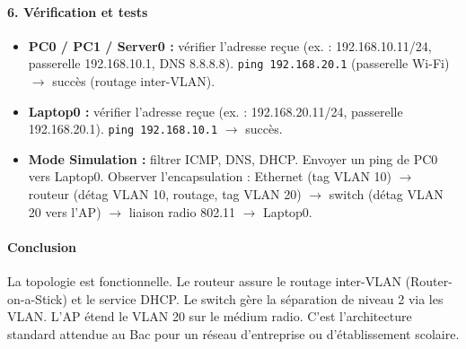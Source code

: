 \documentclass[11pt]{article}
\begin{document}
\begin{exoresolu}
\paragraph{6. Vérification et tests}
\begin{itemize}
    \item \textbf{PC0 / PC1 / Server0 :} vérifier l'adresse reçue (ex. : 192.168.10.11/24, passerelle 192.168.10.1, DNS 8.8.8.8). \texttt{ping 192.168.20.1} (passerelle Wi-Fi) $\rightarrow$ succès (routage inter-VLAN).
    \item \textbf{Laptop0 :} vérifier l'adresse reçue (ex. : 192.168.20.11/24, passerelle 192.168.20.1). \texttt{ping 192.168.10.1} $\rightarrow$ succès.
    \item \textbf{Mode Simulation :} filtrer ICMP, DNS, DHCP. Envoyer un ping de PC0 vers Laptop0. Observer l'encapsulation : Ethernet (tag VLAN 10) $\rightarrow$ routeur (détag VLAN 10, routage, tag VLAN 20) $\rightarrow$ switch (détag VLAN 20 vers l'AP) $\rightarrow$ liaison radio 802.11 $\rightarrow$ Laptop0.
\end{itemize}

\paragraph{Conclusion}
La topologie est fonctionnelle. Le routeur assure le routage inter-VLAN (Router-on-a-Stick) et le service DHCP. Le switch gère la séparation de niveau 2 via les VLAN. L'AP étend le VLAN 20 sur le médium radio. C'est l'architecture standard attendue au Bac pour un réseau d'entreprise ou d'établissement scolaire.
\end{exoresolu}
\end{document}
